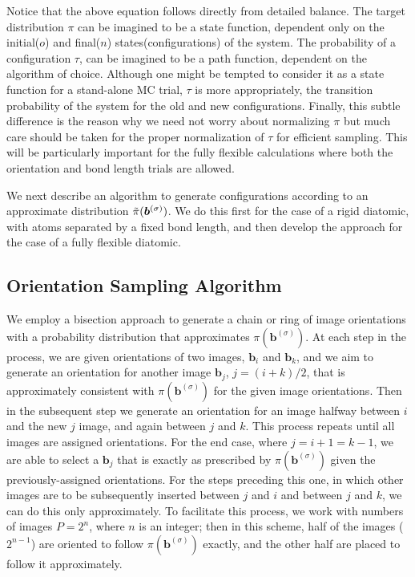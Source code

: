        Notice that the above equation follows directly from detailed balance. The target distribution $\pi$ can be imagined to be a state function, dependent only on the initial($o$) and final($n$) states(configurations) of the system. The probability of a configuration $\tau$, can be imagined to be a path function, dependent on the algorithm of choice. Although one might be tempted to consider it as a state function for a stand-alone MC trial, $\tau$ is more appropriately, the transition probability of the system for the old and new configurations. Finally, this subtle difference is the reason why we need not worry about normalizing $\pi$ but much care should be taken for the proper normalization of $\tau$ for efficient sampling. This will be particularly important for the fully flexible calculations where both the orientation and bond length trials are allowed.

        We next describe an algorithm to generate configurations according to an approximate distribution $\tilde\pi({\boldsymbol {b}}^{(\sigma)})$. We do this first for the case of a rigid diatomic, with atoms separated by a fixed bond length, and then develop the approach for the case of a fully flexible diatomic.
    \subsection{Orientation Sampling Algorithm}
    \label{subsec:orMove}
    We employ a bisection approach to generate a chain or ring of image orientations with a probability distribution that approximates $\pi({\mathbf b}^{(\sigma)})$. At each step in the process, we are given orientations of two images, ${\mathbf b}_i$ and ${\mathbf b}_k$, and we aim to generate an orientation for another image ${\mathbf b}_j$, $j = (i+k)/2$, that is approximately consistent with $\pi({\mathbf b}^{(\sigma)})$ for the given image orientations. Then in the subsequent step we generate an orientation for an image halfway between $i$ and the new $j$ image, and again between $j$ and $k$. This process repeats until all images are assigned orientations. For the end case, where $j = i+1 = k-1$, we are able to select a ${\mathbf b}_j$ that is exactly as prescribed by $\pi({\mathbf b}^{(\sigma)})$ given the previously-assigned orientations. For the steps preceding this one, in which other images are to be subsequently inserted between $j$ and $i$ and between $j$ and $k$, we can do this only approximately. To facilitate this process, we work with numbers of images $P = 2^n$, where $n$ is an integer; then in this scheme, half of the images ($2^{n-1}$) are oriented to follow $\pi({\mathbf b}^{(\sigma)})$ exactly, and the other half are placed to follow it approximately.

